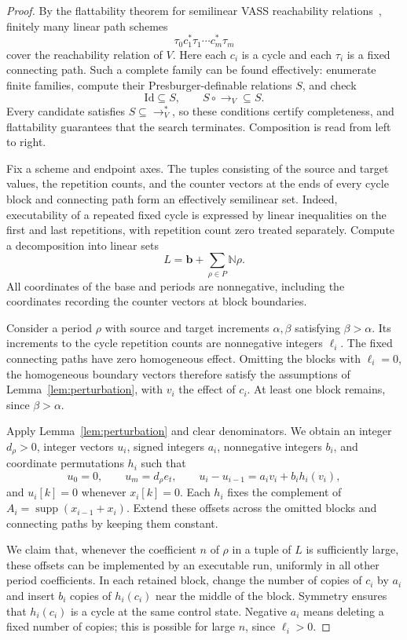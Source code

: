 \documentclass[11pt]{article}
\DeclareMathOperator{\supp}{supp}
\begin{document}
\begin{proof}
By the flattability theorem for semilinear VASS reachability
relations~\cite{Leroux2013}, finitely many linear path schemes
\[
  \tau_0c_1^*\tau_1\cdots c_m^*\tau_m
\]
cover the reachability relation of $V$. Here each $c_i$ is a cycle
and each $\tau_i$ is a fixed connecting path. Such a complete family
can be found effectively: enumerate finite families, compute their
Presburger-definable relations $S$, and check
\[
  \mathrm{Id}\subseteq S,\qquad S\circ{\longrightarrow_V}\subseteq S.
\]
Every candidate satisfies $S\subseteq{\longrightarrow_V^*}$, so
these conditions certify completeness, and flattability guarantees
that the search terminates. Composition is read from left to right.

Fix a scheme and endpoint axes. The tuples consisting of the source
and target values, the repetition counts, and the counter vectors
at the ends of every cycle block and connecting path form an
effectively semilinear set. Indeed, executability of a repeated
fixed cycle is expressed by linear inequalities on the first and
last repetitions, with repetition count zero treated separately.
Compute a decomposition into linear sets
\[
  L=\mathbf{b}+\sum_{\rho\in P}\mathbb{N}\rho.
\]
All coordinates of the base and periods are nonnegative, including
the coordinates recording the counter vectors at block boundaries.

Consider a period $\rho$ with source and target increments
$\alpha,\beta$ satisfying $\beta>\alpha$. Its increments to the
cycle repetition counts are nonnegative integers $\ell_i$.
The fixed connecting paths have zero homogeneous effect. Omitting
the blocks with $\ell_i=0$, the homogeneous boundary vectors
therefore satisfy the assumptions of Lemma~\ref{lem:perturbation},
with $v_i$ the effect of $c_i$. At least one block remains, since
$\beta>\alpha$.

Apply Lemma~\ref{lem:perturbation} and clear denominators. We obtain
an integer $d_\rho>0$, integer vectors $u_i$, signed integers $a_i$,
nonnegative integers $b_i$, and coordinate permutations $h_i$ such that
\[
  u_0=0,\qquad u_m=d_\rho e_t,\qquad
  u_i-u_{i-1}=a_i v_i+b_i h_i(v_i),
\]
and $u_i[k]=0$ whenever $x_i[k]=0$. Each $h_i$ fixes the complement
of $A_i=\supp(x_{i-1}+x_i)$. Extend these offsets across the omitted
blocks and connecting paths by keeping them constant.

We claim that, whenever the coefficient $n$ of $\rho$ in a tuple
of $L$ is sufficiently large, these offsets can be implemented by
an executable run, uniformly in all other period coefficients.
In each retained block, change the number of copies of $c_i$ by
$a_i$ and insert $b_i$ copies of $h_i(c_i)$ near the middle of the
block. Symmetry ensures that $h_i(c_i)$ is a cycle at the same
control state. Negative $a_i$ means deleting a fixed number of
copies; this is possible for large $n$, since $\ell_i>0$.


\end{proof}
\end{document}
